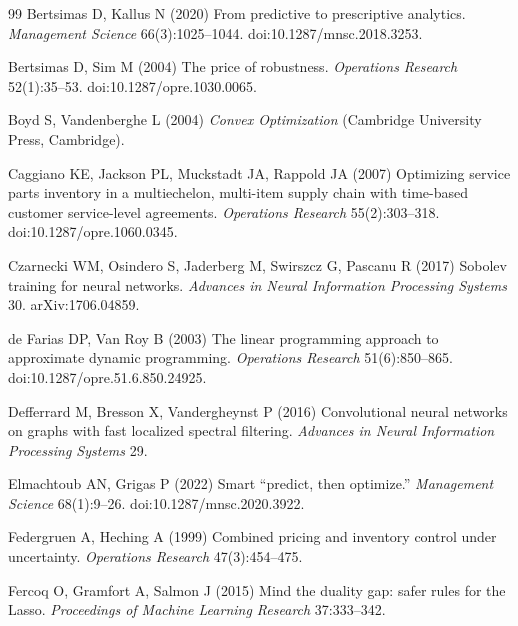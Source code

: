 \documentclass[11pt,letterpaper]{article}
\theoremstyle{definition}
\newcommand{\1}{\mathbf 1}
\begin{document}
\begin{thebibliography}{99}
Bertsimas D, Kallus N (2020) From predictive to prescriptive analytics. \emph{Management Science} 66(3):1025--1044. doi:10.1287/mnsc.2018.3253.

Bertsimas D, Sim M (2004) The price of robustness. \emph{Operations Research} 52(1):35--53. doi:10.1287/opre.1030.0065.

Boyd S, Vandenberghe L (2004) \emph{Convex Optimization} (Cambridge University Press, Cambridge).

Caggiano KE, Jackson PL, Muckstadt JA, Rappold JA (2007) Optimizing service parts inventory in a multiechelon, multi-item supply chain with time-based customer service-level agreements. \emph{Operations Research} 55(2):303--318. doi:10.1287/opre.1060.0345.

Czarnecki WM, Osindero S, Jaderberg M, Swirszcz G, Pascanu R (2017) Sobolev training for neural networks. \emph{Advances in Neural Information Processing Systems} 30. arXiv:1706.04859.

de Farias DP, Van Roy B (2003) The linear programming approach to approximate dynamic programming. \emph{Operations Research} 51(6):850--865. doi:10.1287/opre.51.6.850.24925.

Defferrard M, Bresson X, Vandergheynst P (2016) Convolutional neural networks on graphs with fast localized spectral filtering. \emph{Advances in Neural Information Processing Systems} 29.

Elmachtoub AN, Grigas P (2022) Smart ``predict, then optimize.'' \emph{Management Science} 68(1):9--26. doi:10.1287/mnsc.2020.3922.

Federgruen A, Heching A (1999) Combined pricing and inventory control under uncertainty. \emph{Operations Research} 47(3):454--475.

Fercoq O, Gramfort A, Salmon J (2015) Mind the duality gap: safer rules for the Lasso. \emph{Proceedings of Machine Learning Research} 37:333--342.


\end{thebibliography}
\end{document}

